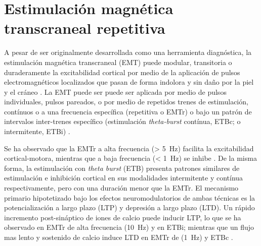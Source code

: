 \section{Estimulación magnética transcraneal repetitiva}
A pesar de ser originalmente desarrollada como una herramienta diagnóstica, la estimulación magnética transcraneal (EMT) puede modular, transitoria o duraderamente la excitabilidad cortical por medio de la aplicación de pulsos electromagnéticos localizados que pasan de forma indolora y sin daño por la piel y el cráneo \parencite{Horvath2011a, Noohi2016}.
La EMT puede ser puede ser aplicada por medio de pulsos individuales, pulsos pareados, o por medio de repetidos trenes de estimulación, contínuos o a una frecuencia específica (repetitiva o EMTr) o bajo un patrón de intervalos inter-trenes específico (estimulación \textit{theta-burst} contínua, ETBc; o intermitente, ETBi) \parencite{Ekhtiari2018}. \par
Se ha observado que la EMTr a alta frecuencia (\deactivatequoting\SI{> 5}{\hertz}\activatequoting) facilita la excitabilidad cortical-motora, mientras que a baja frecuencia (\deactivatequoting\SI{< 1}{\hertz}\activatequoting) se inhibe \parencite{Pascual-Leone1994}.
De la misma forma, la estimulación con \textit{theta burst} (ETB) presenta patrones similares de estimulación e inhibición cortical en sus modalidades intermitente y contínua respectivamente, pero con una duración menor que la EMTr. El mecanismo primario hipotetizado bajo los efectos neuromodulatorios de ambas técnicas es la potencialización a largo plazo (LTP) y depresión a largo plazo (LTD).
Un rápido incremento post-sináptico de iones de calcio puede inducir LTP, lo que se ha observado en EMTr de alta frecuencia (\SI{10}{\hertz}) y en ETBi; mientras que un flujo mas lento y sostenido de calcio induce LTD en EMTr de (\SI{1}{\hertz}) y ETBc \parencite{Ekhtiari2018}.

